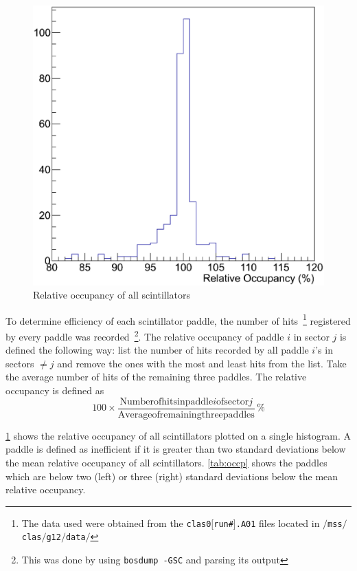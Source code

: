 \begin{figure}
    \includegraphics[trim=0 40 10 40,clip,width=.70\linewidth]{figures/calib/tof/tofko/occp.eps}
    \caption{Relative occupancy of all scintillators}
    \label{plt:occp}
\end{figure}

To determine efficiency of each scintillator paddle, the number of hits~\footnote{The data used were obtained from the \texttt{clas\underline{\hspace{5pt}}0$[$run\#$]$.A01} files located in \texttt{$/$mss$/$clas$/$g12$/$data$/$}} registered by every paddle was recorded~\footnote{This was done by using \texttt{bosdump -GSC} and parsing its output}. The relative occupancy of paddle $i$ in sector $j$ is defined the following way: list the number of hits recorded by all paddle $i$'s in sectors $\neq j$ and remove the ones with the most and least hits from the list. Take the average number of hits of the remaining three paddles. The relative occupancy is defined as 
\[
100 \times \frac{ \mathrm{Number of hits in paddle } i \mathrm{ of sector } j}{\mathrm{Average of remaining three paddles}} \hspace{2pt}\%
\]

\ref{plt:occp} shows the relative occupancy of all scintillators plotted on a single histogram. A paddle is defined as inefficient if it is greater than two standard deviations below the mean relative occupancy of all scintillators. \ref{tab:occp} shows the paddles which are below two (left) or three (right) standard deviations below the mean relative occupancy.

